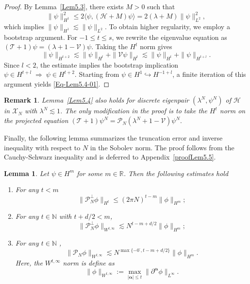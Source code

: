 \documentclass{sn-jnl}%
\newcommand{\m}{\textbf{-}}
\numberwithin{equation}{section}
\theoremstyle{thmstyleone}%
\newtheorem{lemma}{Lemma}[section]%
\theoremstyle{thmstyletwo}%
\newtheorem{remark}{Remark}%
\theoremstyle{thmstylethree}%
\begin{document}
\begin{proof}
By Lemma~\ref{Lem5.3}, there exists $M>0$ such that 
\[
\|\psi\|_{H^1}^2 \leq2 \langle \psi, (\mathcal{H}+M)\psi \rangle 
= 2(\lambda+M)\|\psi\|_{L^2}^2,
\]
which implies $\|\psi\|_{H^1}\lesssim \|\psi\|_{L^2}$. To obtain higher regularity, we employ a bootstrap argument. For $-1 \le t \le s$, we rewrite the eigenvalue equation as
$
(\mathcal{T}+1)\psi = (\lambda+1 - \mathcal{V})\psi.
$
Taking the $H^t$ norm gives
\begin{equation}
\|\psi\|_{H^{t+2}} \lesssim \|\psi\|_{H^t} + \|\mathcal{V}\psi\|_{H^t}
\lesssim \|\psi\|_{H^t} + \|\psi\|_{H^{t+l}}.
\end{equation}
Since $l<2$, the estimate implies the bootstrap implication
$
\psi \in H^{t+l} \;\Longrightarrow\; \psi \in H^{t+2}.
$
Starting from $\psi \in H^1\hookrightarrow H^{-1+l}$, a finite iteration of this argument yields \eqref{Eq-Lem5.4-01}.
\end{proof}
\begin{remark}
    Lemma~\ref{Lem5.4} also holds for discrete eigenpair $(\lambda^N,\psi^N)$ of $\mathcal{H}$ in $\mathscr{X}_N$ with $\lambda^N\lesssim 1$. 
    The only modification in the proof is to take the $H^t$ norm on the projected equation $(\mathcal{T}+1)\psi^N=\mathcal{P}_{N}(\lambda^N+1-\mathcal{V})\psi^N.$
\end{remark}

Finally, the following lemma summarizes the truncation error and inverse inequality with respect to $N$ in the Sobolev norm. The proof follows from the Cauchy-Schwarz inequality and is deferred to Appendix~\ref{proofLem5.5}.
\begin{lemma}\label{Lem5.5}
    Let  $\psi\in H^{m}$ for some $m\in \mathbb{R}$. Then the following estimates hold
    \begin{enumerate}

        \item [$(\mathrm{i})$] For any $t<m$
        \begin{equation}\label{eq-Lem5.5-01}
            \|\mathcal{P}_N^\perp \phi\|_{H^t} \leq (2\pi N)^{t-m}\|\phi\|_{H^{m}};
        \end{equation}
        
        \item [$(\mathrm{ii})$] For any $t\in \mathbb{N}$ with $t+d/2 < m$,
        \begin{equation}\label{eq-Lem5.5-02}
            \|\mathcal{P}_N^\perp \phi\|_{W^{t,\infty}} \lesssim N^{t-m+d/2}\|\phi\|_{H^{m}};
        \end{equation}

        
        \item [$(\mathrm{iii})$] For any $t\in \mathbb{N}$ ,
        \begin{equation}\label{eq-Lem5.5-03}
            \|\mathcal{P}_N \phi\|_{W^{t,\infty}} \lesssim N^{\max\{-0^{\m},t-m+d/2\}}\|\phi\|_{H^{m}}.
        \end{equation}
        Here, the $W^{t,\infty}$ norm is define as 
        \[
            \|\phi\|_{W^{t,\infty}} :=\max_{|\bm \alpha|\leq t}\| \partial^{\bm \alpha}\phi\|_{L^{\infty}}.
        \]
    \end{enumerate}
\end{lemma}
\end{document}
